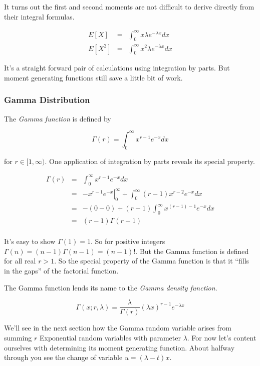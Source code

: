 \documentclass[]{article}
\begin{document}
It turns out the first and second moments are not difficult
to derive directly from their integral formulas.

\begin{eqnarray*}
E[X] & = & \int_0^{\infty} x \lambda e^{-\lambda x} dx \\
E[X^2] & = & \int_0^{\infty} x^2 \lambda e^{-\lambda x} dx
\end{eqnarray*}

It's a straight forward pair of calculations using integration
by parts. But moment generating functions still save a little
bit of work.

\subsubsection{Gamma Distribution}

The \emph{Gamma function} is defined by

\begin{equation} \label{gamma_function}
\Gamma(r) = \int_{0}^{\infty} x^{r-1} e^{-x} dx
\end{equation}

for $r \in [1,\infty)$.
One application of integration by parts reveals its
special property.

\begin{eqnarray*}
\Gamma(r) &= &\int_{0}^{\infty} x^{r-1} e^{-x} dx \\
  &= &\left. -x^{r-1}e^{-x} \right|_0^{\infty}
     + \int_0^{\infty} (r-1)x^{r-2} e^{-x} dx \\
  &= &-(0 - 0) + (r-1) \int_0^{\infty} x^{(r-1) - 1} e^{-x} dx \\
  &= &(r-1) \Gamma(r-1) \\
\end{eqnarray*}

It's easy to show $\Gamma(1)=1$.  So for positive integers
$\Gamma(n) = (n-1)\Gamma(n-1) = (n-1)!$.  But the Gamma function
is defined for all real $r>1$.  So the special property of the
Gamma function is that it
``fills in the gaps'' of the factorial function.

The Gamma function lends its name to the
\emph{Gamma density function}.

\begin{equation} \label{gamma_density}
\Gamma(x; r, \lambda) = \frac{\lambda}{\Gamma(r)} 
     (\lambda x)^{r-1} e^{- \lambda x}
\end{equation}

We'll see in the next section how the Gamma random variable
arises from summing $r$ Exponential random variables with
parameter $\lambda$.
For now let's content ourselves with determining its moment
generating function.  About halfway through you see the change
of variable $u = (\lambda - t)x$.
\end{document}
